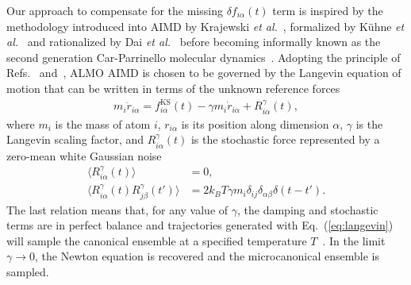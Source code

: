 \documentclass[aip,jcp,reprint,amsmath,amssymb]{revtex4-1}
\begin{document}
Our approach to compensate for the missing $\delta f_{i\alpha}(t)$ term is inspired by the methodology introduced into AIMD by Krajewski \emph{et al.}~\cite{Krajewski}, formalized by K\"uhne \emph{et al.}~\cite{a:2ndcpmd} and rationalized by Dai \emph{et al.}~\cite{a:langevin-why} before becoming informally known as the second generation Car-Parrinello molecular dynamics~\cite{Kuhne2013}. 
Adopting the principle of 
Refs.~ and~, 
ALMO AIMD is chosen to be governed by the Langevin equation of motion that can be written in terms of the unknown reference forces
%
\begin{align}
\label{eq:langevin}
m_i \ddot{r}_{i\alpha} = f^{\text{KS}}_{i\alpha}(t) - \gamma m_i \dot{r}_{i\alpha} + R^{\gamma}_{i\alpha} (t),
\end{align}
%
where $m_i$ is the mass of atom $i$, $r_{i\alpha}$ is its position along dimension $\alpha$, $\gamma$ is the Langevin scaling factor, and $R^{\gamma}_{i\alpha} (t)$ is the stochastic force represented by a zero-mean white Gaussian noise %
%
\begin{align}
\label{eq:stochastic}
\langle R^{\gamma}_{i\alpha} (t) \rangle &= 0, \\
\langle R^{\gamma}_{i\alpha} (t)  R^{\gamma}_{j\beta} (t') \rangle &= 2 k_B T \gamma m_i \delta_{ij} \delta_{\alpha\beta} \delta(t-t').
\end{align}
% 
The last relation means that, for any value of $\gamma$, the damping and stochastic terms are in perfect balance and trajectories generated with Eq.~(\ref{eq:langevin}) will sample the canonical ensemble at a specified temperature $T$~\cite{a:Kubo-1986}. 
In the limit $\gamma \rightarrow 0$, the Newton equation is recovered and the microcanonical ensemble is sampled. 
\end{document}
